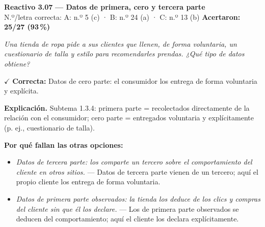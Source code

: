 \documentclass[10pt,letterpaper]{article}
\begin{document}
\begin{minipage}{\textwidth}
{\color{guinda}\textbf{Reactivo 3.07}} \textbf{— Datos de primera, cero y tercera parte}\\[-1pt]
{\scriptsize N.º/letra correcta: A: n.º 5 (c) · B: n.º 24 (a) · C: n.º 13 (b) \hfill \textbf{Acertaron: 25/27 (93\,\%)}}

\textit{Una tienda de ropa pide a sus clientes que llenen, de forma voluntaria, un cuestionario de talla y estilo para recomendarles prendas. ¿Qué tipo de datos obtiene?}

\textcolor{verde}{$\checkmark$} \textbf{Correcta:} Datos de cero parte: el consumidor los entrega de forma voluntaria y explícita.

\textbf{Explicación.} Subtema 1.3.4: primera parte = recolectados directamente de la relación con el consumidor; cero parte = entregados voluntaria y explícitamente (p. ej., cuestionario de talla).

\textbf{Por qué fallan las otras opciones:}
\begin{itemize}[itemsep=0pt,topsep=1pt,leftmargin=1.3em,parsep=0pt]
\item[\textcolor{rojo}{$\times$}] \textit{Datos de tercera parte: los comparte un tercero sobre el comportamiento del cliente en otros sitios.} --- Datos de tercera parte vienen de un tercero; aquí el propio cliente los entrega de forma voluntaria.
\item[\textcolor{rojo}{$\times$}] \textit{Datos de primera parte observados: la tienda los deduce de los clics y compras del cliente sin que él los declare.} --- Los de primera parte observados se deducen del comportamiento; aquí el cliente los declara explícitamente.
\end{itemize}
\end{minipage}\par\vspace{5pt}{\color{gray!40}\hrule}\vspace{5pt}
\end{document}
